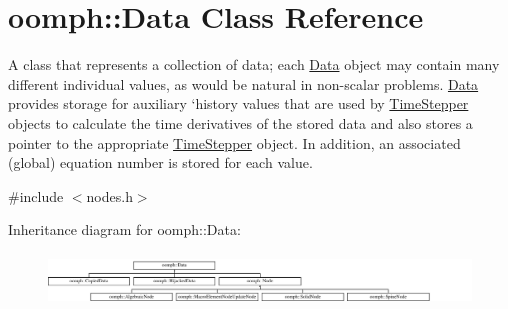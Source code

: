 \hypertarget{classoomph_1_1Data}{}\section{oomph\+:\+:Data Class Reference}
\label{classoomph_1_1Data}


A class that represents a collection of data; each \hyperlink{classoomph_1_1Data}{Data} object may contain many different individual values, as would be natural in non-\/scalar problems. \hyperlink{classoomph_1_1Data}{Data} provides storage for auxiliary `history\textquotesingle{} values that are used by \hyperlink{classoomph_1_1TimeStepper}{Time\+Stepper} objects to calculate the time derivatives of the stored data and also stores a pointer to the appropriate \hyperlink{classoomph_1_1TimeStepper}{Time\+Stepper} object. In addition, an associated (global) equation number is stored for each value.  




{\ttfamily \#include $<$nodes.\+h$>$}

Inheritance diagram for oomph\+:\+:Data\+:\begin{figure}[H]
\begin{center}
\leavevmode
\includegraphics[height=1.382716cm]{classoomph_1_1Data}
\end{center}
\end{figure}
